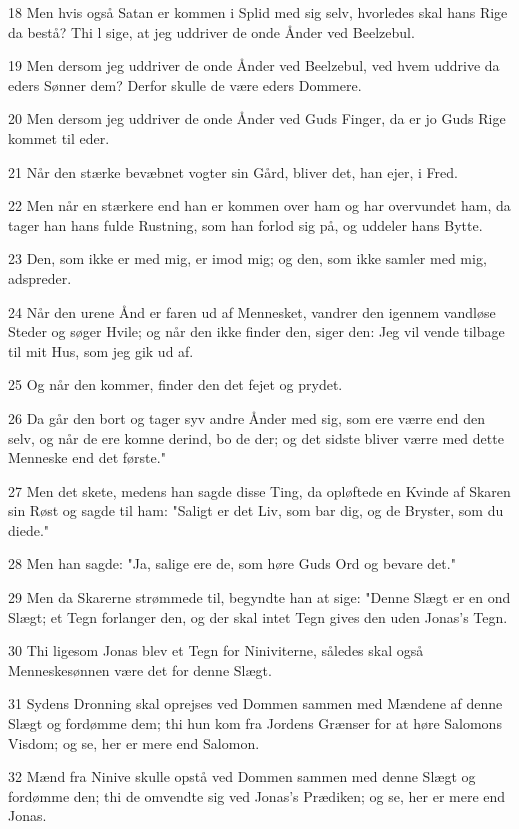 \par 18 Men hvis også Satan er kommen i Splid med sig selv, hvorledes skal hans Rige da bestå? Thi l sige, at jeg uddriver de onde Ånder ved Beelzebul.
\par 19 Men dersom jeg uddriver de onde Ånder ved Beelzebul, ved hvem uddrive da eders Sønner dem? Derfor skulle de være eders Dommere.
\par 20 Men dersom jeg uddriver de onde Ånder ved Guds Finger, da er jo Guds Rige kommet til eder.
\par 21 Når den stærke bevæbnet vogter sin Gård, bliver det, han ejer, i Fred.
\par 22 Men når en stærkere end han er kommen over ham og har overvundet ham, da tager han hans fulde Rustning, som han forlod sig på, og uddeler hans Bytte.
\par 23 Den, som ikke er med mig, er imod mig; og den, som ikke samler med mig, adspreder.
\par 24 Når den urene Ånd er faren ud af Mennesket, vandrer den igennem vandløse Steder og søger Hvile; og når den ikke finder den, siger den: Jeg vil vende tilbage til mit Hus, som jeg gik ud af.
\par 25 Og når den kommer, finder den det fejet og prydet.
\par 26 Da går den bort og tager syv andre Ånder med sig, som ere værre end den selv, og når de ere komne derind, bo de der; og det sidste bliver værre med dette Menneske end det første."
\par 27 Men det skete, medens han sagde disse Ting, da opløftede en Kvinde af Skaren sin Røst og sagde til ham: "Saligt er det Liv, som bar dig, og de Bryster, som du diede."
\par 28 Men han sagde: "Ja, salige ere de, som høre Guds Ord og bevare det."
\par 29 Men da Skarerne strømmede til, begyndte han at sige: "Denne Slægt er en ond Slægt; et Tegn forlanger den, og der skal intet Tegn gives den uden Jonas's Tegn.
\par 30 Thi ligesom Jonas blev et Tegn for Niniviterne, således skal også Menneskesønnen være det for denne Slægt.
\par 31 Sydens Dronning skal oprejses ved Dommen sammen med Mændene af denne Slægt og fordømme dem; thi hun kom fra Jordens Grænser for at høre Salomons Visdom; og se, her er mere end Salomon.
\par 32 Mænd fra Ninive skulle opstå ved Dommen sammen med denne Slægt og fordømme den; thi de omvendte sig ved Jonas's Prædiken; og se, her er mere end Jonas.
